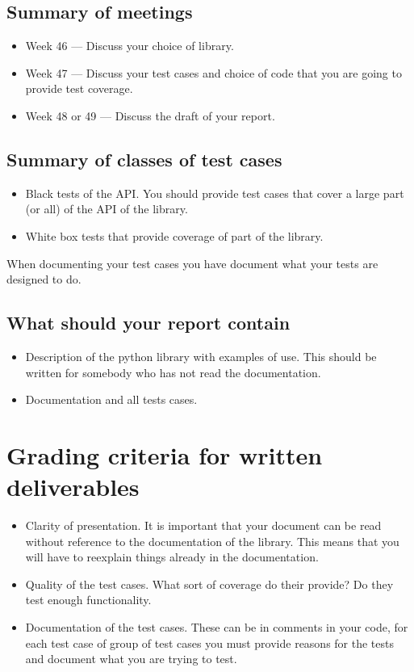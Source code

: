\documentclass[a4page]{article}
\begin{document}
  \subsection*{Summary of meetings}
  \begin{itemize}
  \item Week 46  --- Discuss your choice of library.
  \item Week 47  --- Discuss your test cases and choice of code that you are
    going to provide test coverage.
  \item Week 48 or 49 --- Discuss the draft of your report.
  \end{itemize}
  \subsection*{Summary of classes of test cases}
  \begin{itemize}
  \item Black tests of the API. You should provide test cases that cover a
    large  part (or all) of the API of the library.
  \item White box tests that provide coverage of part of the library.
  \end{itemize}
  When documenting your test cases you have document what your tests are
  designed to do.

  \subsection*{What should your report contain}
  \begin{itemize}
  \item Description of the python library with examples of use. This should be
    written for somebody who has not read the documentation.
  \item Documentation and all tests cases.
  \end{itemize}
\section{Grading criteria for written deliverables}
\begin{itemize}
\item Clarity of presentation. It is important that your document can
  be read without reference to the documentation of the library. This
  means that you will have to reexplain things already in the
  documentation. 
\item Quality of the test cases. What sort of coverage do their
  provide? Do they test enough functionality. 
\item Documentation of the test cases. These can be in comments in
  your code, for each test case of group of test cases you must
  provide reasons for the tests and document  what you are trying to
  test.
 
\end{itemize}
\end{document}
